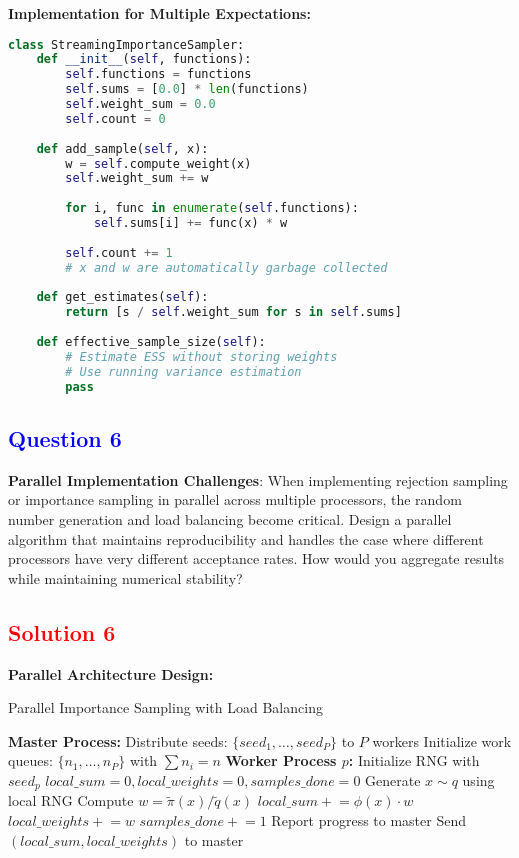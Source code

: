 \documentclass[11pt]{article}
\newcommand{\question}[1]{\subsection*{\textcolor{blue}{Question #1}}}
\newcommand{\solution}[1]{\subsection*{\textcolor{red}{Solution #1}}}
\begin{document}
\textbf{Implementation for Multiple Expectations:}
\begin{lstlisting}[language=Python, basicstyle=\small]
class StreamingImportanceSampler:
    def __init__(self, functions):
        self.functions = functions
        self.sums = [0.0] * len(functions)
        self.weight_sum = 0.0
        self.count = 0
        
    def add_sample(self, x):
        w = self.compute_weight(x)
        self.weight_sum += w
        
        for i, func in enumerate(self.functions):
            self.sums[i] += func(x) * w
        
        self.count += 1
        # x and w are automatically garbage collected
    
    def get_estimates(self):
        return [s / self.weight_sum for s in self.sums]
    
    def effective_sample_size(self):
        # Estimate ESS without storing weights
        # Use running variance estimation
        pass
\end{lstlisting}

\question{6}
\textbf{Parallel Implementation Challenges}: When implementing rejection sampling or importance sampling in parallel across multiple processors, the random number generation and load balancing become critical. Design a parallel algorithm that maintains reproducibility and handles the case where different processors have very different acceptance rates. How would you aggregate results while maintaining numerical stability?

\solution{6}
\textbf{Parallel Architecture Design:}

\begin{algorithm}
\caption{Parallel Importance Sampling with Load Balancing}
\begin{algorithmic}[1]
\STATE \textbf{Master Process:}
\STATE Distribute seeds: $\{seed_1, \ldots, seed_P\}$ to $P$ workers
\STATE Initialize work queues: $\{n_1, \ldots, n_P\}$ with $\sum n_i = n$
\STATE \textbf{Worker Process $p$:}
\STATE Initialize RNG with $seed_p$
\STATE $local\_sum = 0, local\_weights = 0, samples\_done = 0$
    \STATE Generate $x \sim q$ using local RNG
    \STATE Compute $w = \tilde{\pi}(x)/\tilde{q}(x)$
    \STATE $local\_sum \mathrel{+}= \phi(x) \cdot w$
    \STATE $local\_weights \mathrel{+}= w$
    \STATE $samples\_done \mathrel{+}= 1$
        \STATE Report progress to master
    \ENDIF
\ENDWHILE
\STATE Send $(local\_sum, local\_weights)$ to master
\end{algorithmic}
\end{algorithm}
\end{document}
